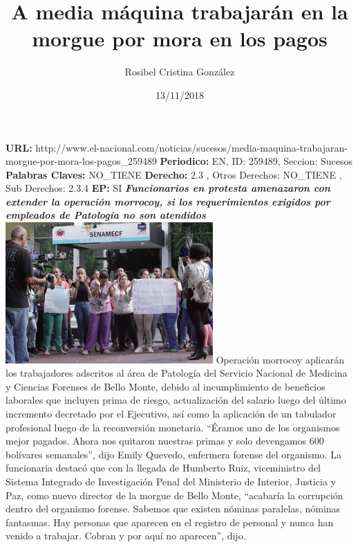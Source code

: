 \documentclass{article}%
\title{\textbf{A media máquina trabajarán en la morgue por mora en los pagos}}%
\author{Rosibel Cristina González}%
\date{13/11/2018}%
\begin{document}
%
\normalsize%
\maketitle%
\textbf{URL: }%
http://www.el{-}nacional.com/noticias/sucesos/media{-}maquina{-}trabajaran{-}morgue{-}por{-}mora{-}los{-}pagos\_259489\newline%
%
\textbf{Periodico: }%
EN, %
ID: %
259489, %
Seccion: %
Sucesos\newline%
%
\textbf{Palabras Claves: }%
NO\_TIENE\newline%
%
\textbf{Derecho: }%
2.3%
, Otros Derechos: %
NO\_TIENE%
, Sub Derechos: %
2.3.4%
\newline%
%
\textbf{EP: }%
SI\newline%
\newline%
%
\textbf{\textit{Funcionarios en protesta amenazaron con extender la operación morrocoy, si los requerimientos exigidos por empleados de Patología no son atendidos}}%
\newline%
\newline%
%
\includegraphics[width=300px]{119.jpg}%
\newline%
%
Operación morrocoy aplicarán los trabajadores adscritos al área de Patología del Servicio Nacional de Medicina y Ciencias Forenses de Bello Monte, debido al incumplimiento de beneficios laborales que incluyen prima de riesgo, actualización del salario luego del último incremento decretado por el Ejecutivo, así como la aplicación de un tabulador profesional luego de la reconversión monetaria. “Éramos uno de los organismos mejor pagados. Ahora nos quitaron nuestras primas y solo devengamos 600 bolívares semanales”, dijo Emily Quevedo, enfermera forense del organismo.%
\newline%
%
La funcionaria destacó que con la llegada de Humberto Ruiz, viceministro del Sistema Integrado de Investigación Penal del Ministerio de Interior, Justicia y Paz, como nuevo director de la morgue de Bello Monte, “acabaría la corrupción dentro del organismo forense. Sabemos que existen nóminas paralelas, nóminas fantasmas. Hay personas que aparecen en el registro de personal y nunca han venido a trabajar. Cobran y por aquí no aparecen”, dijo.%
\end{document}

